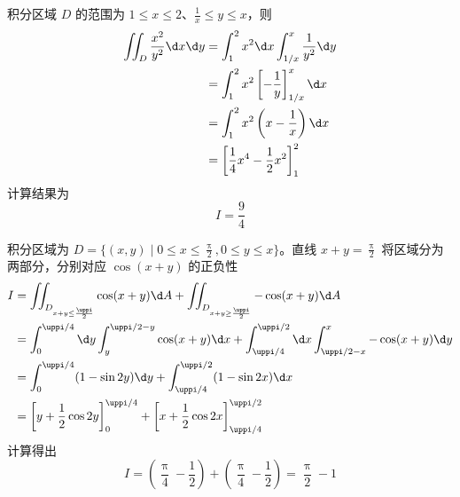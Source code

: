 \begin{solution}

    积分区域 $D$ 的范围为 $1 \le x \le 2$、$\frac{1}{x} \le y \le x$，则
    \begin{equation}
        \begin{aligned}
            \iint_{D} \frac{x^{2}}{y^{2}} \d x \d y & = \int_{1}^{2} x^{2} \d x \int_{1 / x}^{x} \frac{1}{y^{2}} \d y   \\
                                                    & = \int_{1}^{2} x^{2} \left[ -\frac{1}{y} \right]_{1 / x}^{x} \d x \\
                                                    & = \int_{1}^{2} x^{2} \left( x - \frac{1}{x} \right) \d x          \\
                                                    & = \left[ \frac{1}{4} x^{4} - \frac{1}{2} x^{2} \right]_{1}^{2}
        \end{aligned}
    \end{equation}
    计算结果为
    \begin{equation}
        I = \boxed{\frac{9}{4}}
    \end{equation}


    积分区域为 $D = \{ (x, y) \mid 0 \le x \le \frac{\uppi}{2}, 0 \le y \le x \}$。直线 $x+y = \frac{\uppi}{2}$ 将区域分为两部分，分别对应 $\cos(x+y)$ 的正负性
    \begin{equation}
        \begin{aligned}
            I & = \iint_{D_{x+y \le \frac{\uppi}{2}}} \cos (x+y) \d A + \iint_{D_{x+y \ge \frac{\uppi}{2}}} -\cos (x+y) \d A                         \\
              & = \int_{0}^{\uppi/4} \d y \int_{y}^{\uppi/2-y} \cos (x+y) \d x + \int_{\uppi/4}^{\uppi/2} \d x \int_{\uppi/2-x}^{x} -\cos (x+y) \d y \\
              & = \int_{0}^{\uppi/4} (1 - \sin 2y) \d y + \int_{\uppi/4}^{\uppi/2} (1 - \sin 2x) \d x                                                \\
              & = \left[ y + \frac{1}{2} \cos 2y \right]_{0}^{\uppi/4} + \left[ x + \frac{1}{2} \cos 2x \right]_{\uppi/4}^{\uppi/2}
        \end{aligned}
    \end{equation}
    计算得出
    \begin{equation}
        I = \left( \frac{\uppi}{4} - \frac{1}{2} \right) + \left( \frac{\uppi}{4} - \frac{1}{2} \right) = \boxed{\frac{\uppi}{2}-1}
    \end{equation}
\end{solution}


